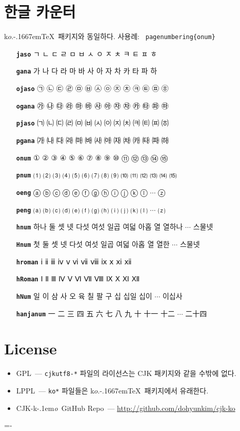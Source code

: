 \documentclass[dvipdfmx,b5paper]{article}
\def\cs#1{\texttt{\color{teal}\char92 #1}}
\def\koTeX{k$o$.\kern-.1667em\TeX}
\def\cjkko{\mbox{CJK-k\kern-.1em\textit{o}}}
\begin{document}
\section{한글 카운터}
\koTeX\ 패키지와 동일하다. 사용례: \cs{pagenumbering\{onum\}}
\begin{itemize}\leftskip=1cm =1em \itemsep=0pt plus0pt
      \def\cs#1{\texttt{\bfseries #1}}
  \item[\cs{jaso}] ㄱ ㄴ ㄷ ㄹ ㅁ ㅂ ㅅ ㅇ ㅈ ㅊ ㅋ ㅌ ㅍ ㅎ
  \item[\cs{gana}] 가 나 다 라 마 바 사 아 자 차 카 타 파 하
  \item[\cs{ojaso}] ㉠ ㉡ ㉢ ㉣ ㉤ ㉥ ㉦ ㉧ ㉨ ㉩ ㉪ ㉫ ㉬ ㉭
  \item[\cs{ogana}] ㉮ ㉯ ㉰ ㉱ ㉲ ㉳ ㉴ ㉵ ㉶ ㉷ ㉸ ㉹ ㉺ ㉻
  \item[\cs{pjaso}] ㈀ ㈁ ㈂ ㈃ ㈄ ㈅ ㈆ ㈇ ㈈ ㈉ ㈊ ㈋ ㈌ ㈍
  \item[\cs{pgana}] ㈎ ㈏ ㈐ ㈑ ㈒ ㈓ ㈔ ㈕ ㈖ ㈗ ㈘ ㈙ ㈚ ㈛
  \item[\cs{onum}]  ① ② ③ ④ ⑤ ⑥ ⑦ ⑧ ⑨ ⑩ ⑪ ⑫ ⑬ ⑭ ⑮
  \item[\cs{pnum}] ⑴ ⑵ ⑶ ⑷ ⑸ ⑹ ⑺ ⑻ ⑼ ⑽ ⑾ ⑿ ⒀ ⒁ ⒂
  \item[\cs{oeng}] ⓐ ⓑ ⓒ ⓓ ⓔ ⓕ ⓖ ⓗ ⓘ ⓙ ⓚ ⓛ $\cdots$ ⓩ
  \item[\cs{peng}] ⒜ ⒝ ⒞ ⒟ ⒠ ⒡ ⒢ ⒣ ⒤ ⒥ ⒦ ⒧ $\cdots$ ⒵
  \item[\cs{hnum}] 하나 둘 셋 넷 다섯 여섯 일곱 여덟 아홉 열 열하나 $\cdots$ 스물넷
  \item[\cs{Hnum}] 첫 둘 셋 넷 다섯 여섯 일곱 여덟 아홉 열 열한 $\cdots$ 스물넷
  \item[\cs{hroman}] ⅰ ⅱ ⅲ ⅳ ⅴ ⅵ ⅶ ⅷ ⅸ ⅹ ⅺ ⅻ
  \item[\cs{hRoman}] Ⅰ Ⅱ Ⅲ Ⅳ Ⅴ Ⅵ Ⅶ Ⅷ Ⅸ Ⅹ Ⅺ Ⅻ
  \item[\cs{hNum}] 일 이 삼 사 오 육 칠 팔 구 십 십일 십이 $\cdots$ 이십사
  \item[\cs{hanjanum}] 一 二 三 四 五 六 七 八 九 十 十一 十二 $\cdots$ 二十四
\end{itemize}

\section{License}
\begin{itemize}
  \item GPL~--- \verb|cjkutf8-*| 파일의 라이선스는 CJK 패키지와
    같을 수밖에 없다.
  \item LPPL~--- \verb|ko*| 파일들은 \koTeX\ 패키지에서 유래한다.
  \item \cjkko\ GitHub Repo~--- \url{http://github.com/dohyunkim/cjk-ko}
\end{itemize}

\begin{flushright}
  \fboxsep=-\fboxrule
\end{flushright}
\end{document}
